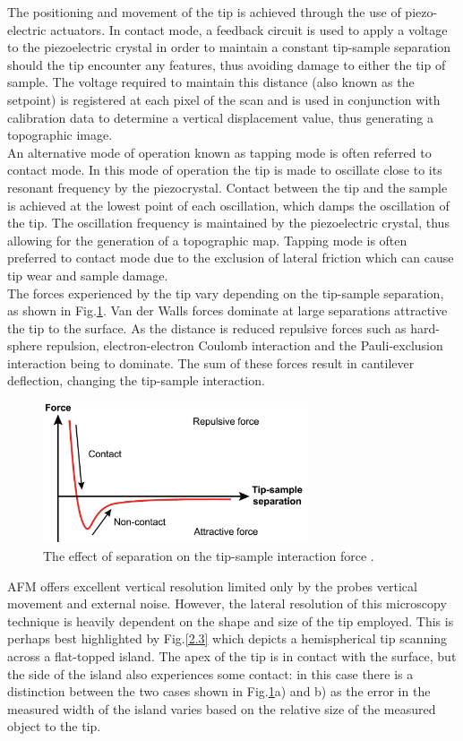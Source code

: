The positioning and movement of the tip is achieved through the use of piezo-electric actuators. In contact mode, a feedback circuit is used to apply a voltage to the piezoelectric crystal in order to maintain a constant tip-sample separation should the tip encounter any features, thus avoiding damage to either the tip of sample. The voltage required to maintain this distance (also known as the setpoint) is registered at each pixel of the scan and is used in conjunction with calibration data to determine a vertical displacement value, thus generating a topographic image.\\
An alternative mode of operation known as tapping mode is often referred to contact mode. In this mode of operation the tip is made to oscillate close to its resonant frequency by the piezocrystal. Contact  between the tip and the sample is achieved at the lowest point of each oscillation, which damps the oscillation of the tip. The oscillation frequency is maintained by the piezoelectric crystal, thus allowing for the generation of a topographic map. Tapping mode is often preferred to contact mode due to the exclusion of lateral friction which can cause tip wear and sample damage.\\
The forces experienced by the tip vary depending on the tip-sample separation, as shown in Fig.\ref{2.2}. Van der Walls forces dominate at large separations attractive the tip to the surface. As the distance is reduced repulsive forces such as hard-sphere repulsion, electron-electron Coulomb interaction and the Pauli-exclusion interaction being to dominate. The sum of these forces result in cantilever deflection, changing the tip-sample interaction.

\begin{figure}[h]
	\centering
	\includegraphics[width=0.7\textwidth]{Figs/Ch2/AFMint.png}
	\caption {The effect of separation on the tip-sample interaction force \cite{Zhu2010}.}
	\label{2.2}
\end{figure}
\FloatBarrier

AFM offers excellent vertical resolution limited only by the probes vertical movement and external noise. However, the lateral resolution of this microscopy technique is heavily dependent on the shape and size of the tip employed. This is perhaps best highlighted by Fig.\ref{2.3} which depicts a hemispherical tip scanning across a flat-topped island. The apex of the tip is in contact with the surface, but the side of the island also experiences some contact: in this case there is a distinction between the two cases shown in Fig.\ref{2.2}a) and b) as the error in the measured width of the island varies based on the relative size of the measured object to the tip.

